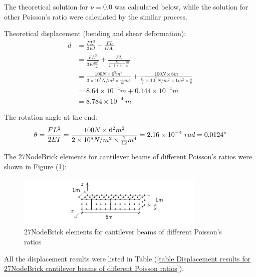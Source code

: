 \documentclass[fleqn,11pt]{article}
\begin{document}
The theoretical solution for $\nu=0.0$ was calculated below, while the solution for other Poisson's ratio were calculated by the similar process. 

Theoretical displacement (bending and shear deformation):
\begin{equation}
  \begin{aligned}
  d &=\frac{FL^3}{3EI}+\frac{FL}{GA_v} \\
  &= \frac{FL^3}{3E\frac{bh^3}{12}}+\frac{FL}{\frac{E}{2(1+\nu)} \frac{bh}{\kappa}} \\ 
    &= \frac{100 N \times 6^3 m^3}{3\times 10^8 N/m^2 \times \frac{1}{12} m^4}+ 
    \frac{100 N\times 6 m}{\frac{10}{2} \times 10^7 N/m^2\times 1 m^2 \times \frac{5}{6}} \\ 
    &=8.64\times 10^{-4} m + 0.144 \times 10^{-4} m   \\
   & =8.784\times 10^{-4} \ m
   \end{aligned}
\end{equation}

The rotation angle at the end:
\begin{equation}
  \theta =\frac{FL^2}{2EI} 
   =\frac{100 N \times 6^2 m^2} {2\times 10^8 N/m^2 \times \frac{1}{12} m^4} 
 =2.16 \times 10^{-4} \ rad = 0.0124 \degree 
\end{equation}

The 27NodeBrick elements for cantilever beams of different Poisson's ratios were shown in Figure (\ref{fig 27NodeBrick elements for cantilever beams of different Poisson's ratios}):
\begin{figure}[H]
  \centering
  \includegraphics[width=9cm]{../Figure-files/beam_27brick_6div.pdf}
  \caption{27NodeBrick elements for cantilever beams of different Poisson's ratios}
  \label{fig 27NodeBrick elements for cantilever beams of different Poisson's ratios}
\end{figure}


All the displacement results were listed in Table (\ref{table Displacement results for 27NodeBrick cantilever beams of different Poisson ratios}). 
\end{document}

